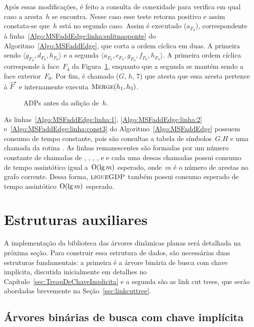Após essas modificações, é feito a consulta de conexidade para verifica em qual caso a aresta~$h$ se encontra.
Nesse caso esse teste retorna positivo e assim constata-se que~$h$ está no segundo caso.
Assim é executado \LCOSplit($a_{F_0}$), correspondente à linha~\ref{Algo:MSFaddEdge:linha:splitnaoponte} do Algoritmo~\ref{Algo:MSFaddEdge}, que corta a ordem cíclica em duas.
A primeira sendo $\langle g_{F_0}, d_{F_0}, h_{F_0}\rangle$ e a segunda $\langle a_{F_0}, c_{F_0}, g_{F_0}, f_{F_0}, h_{F_0}\rangle$.
A primeira ordem cíclica corresponde à face~$F_4$ da Figura~\ref{fig:MSF-adiciona-nao-ponte-2}, enquanto que a segunda se mantém sendo a face exterior~$F_0$.
Por fim, é chamado \MSFupdate($G$, $h$, $7$) que atesta que essa aresta pertence à $\hat F^\star$ e internamente executa $\text{\scshape Merge}(h_1, h_3)$.

\begin{figure}
\scalebox{1}{

}
\caption{ADPs antes da adição de~$h$.}
\label{fig:MSF-adiciona-nao-ponte-2}
\end{figure}



As linhas~\ref{Algo:MSFaddEdge:linha:1}, \ref{Algo:MSFaddEdge:linha:2} e~\ref{Algo:MSFaddEdge:linha:const3} do Algoritmo~\ref{Algo:MSFaddEdge} possuem consumo de tempo constante, pois são consultas a tabela de símbolos~$G.H$ e uma chamada da rotina \LCOMakeOcto{}.
As linhas remanescentes são formadas por um número constante de chamadas de \LCOFindNode, \LCOCycle{}, \LCOMerge{}, \LCOSplit{}, \MSFupdate{} e \LCOConnected{} e cada uma dessas chamadas possui consumo de tempo assintótico igual a~$\mathrm{O}(\lg m)$ esperado, onde~$m$ é o número de arestas no grafo corrente.
Dessa forma, $\text{\scshape ligueGDP}$ também possui consumo esperado de tempo assintótico~$\mathrm{O}(\lg m)$ esperado.

\section{Estruturas auxiliares}

A implementação da biblioteca das árvores dinâmicas planas será detalhada na próxima seção.
Para construir essa estrutura de dados, são necessárias duas estruturas fundamentais: a primeira é a árvore binária de busca com chave implícita, discutida inicialmente em detalhes no Capítulo~\ref{sec:TreapDeChaveImplicita} e a segunda são as link cut trees, que serão abordadas brevemente na Seção~\ref{sec:linkcuttree}.

\subsection{Árvores binárias de busca com chave implícita}

